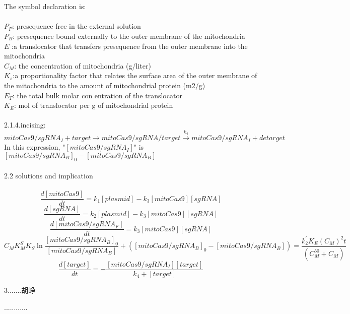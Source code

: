 \documentclass[UTF8]{ctexart}%
\begin{document}
	\\\\
	The symbol declaration is:\\\\
	$P_F$: presequence free in the external  solution\\
	$P_B$: presequence bound externally to the outer membrane of the mitochondria\\
	$E$ :a translocator that transfers presequence from the outer membrane into the mitochondria\\
	$C_M$: the concentration of mitochondria (g/liter)\\
	$K_s$:a proportionality factor that relates the surface area of the outer membrane of the mitochondria to the amount of mitochondrial protein (m2/g) \\
	$E_T$: the total bulk molar con entration of the translocator\\
	$K_E$: mol of translocator per g of mitochondrial protein
	\\\\ 
	2.1.4.incising:
	\begin{displaymath}
	mitoCas9/sgRNA_I+target\longrightarrow mitoCas9/sgRNA/target\stackrel{k_4} {\longrightarrow} mitoCas9/sgRNA_I+detarget
	\end{displaymath}
	In this expression, "$[mitoCas9/sgRNA_I]$" is $ [mitoCas9/sgRNA_B]_0-[mitoCas9/sgRNA_B]$ 
	\\\\
	{\Large 2.2 solutions and implication} 
	\\\\
	\begin{equation}
	\frac{d[mitoCas9]}{dt}=k_1[plasmid]-k_3[mitoCas9][sgRNA]\tag{1}
	\end{equation}
	\begin{equation}
	\frac{d[sgRNA]}{dt}=k_2[plasmid]-k_3[mitoCas9][sgRNA]\tag{2}
	\end{equation}
	\begin{equation}
	\frac{d[mitoCas9/sgRNA_F]}{dt}=k_3[mitoCas9][sgRNA]\tag{3}
	\end{equation}
	\begin{equation}
	C_MK_M^SK_S\ln\frac{[mitoCas9/sgRNA_B]_0}{[mitoCas9/sgRNA_B]}+([mitoCas9/sgRNA_B]_0-[mitoCas9/sgRNA_B])=\frac{k_2^{'}K_E(C_M)^2\tag{4} t}{(C_M^{50}+C_M)}
	\end{equation}
	\begin{equation}
	\frac{d[target]}{dt}=-\frac{[mitoCas9/sgRNA_I][target]}{k_4+[target]}\tag{5}
	\end{equation}
	\begin{center}
	{\Large 3.......胡峥}
	\end{center}
............
\end{document}
